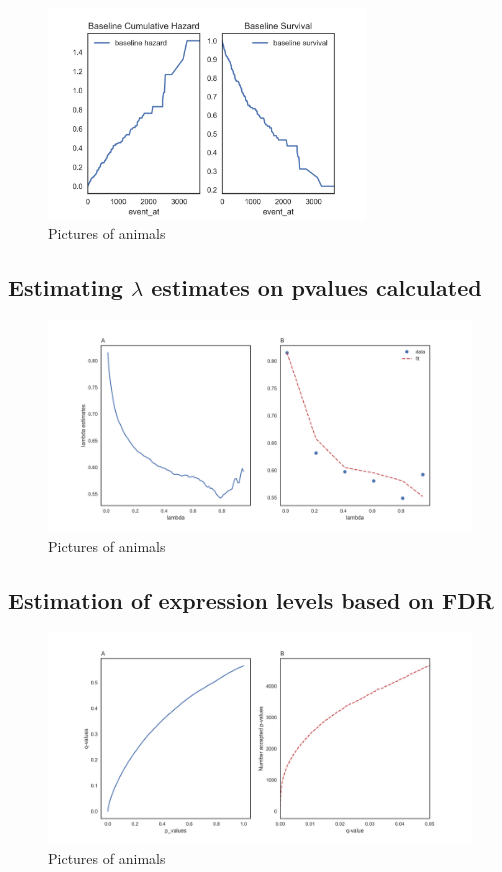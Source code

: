 \documentclass[a4paper,9pt]{article}
\begin{document}
\begin{figure}[bh]
    \centering
      \includegraphics[width=0.75\textwidth]{survial_plot_one_mock_gene.png}
    \caption{Pictures of animals}\label{fig:animals}
\end{figure}
  	
	
	\subsection {Estimating $\lambda$ estimates on pvalues calculated}
\begin{figure}[h]
    \centering
      \includegraphics[width=\textwidth]{lambdaestimatescurvefitting.png}
    \caption{Pictures of animals}\label{fig:animals}
\end{figure}


	\subsection {Estimation of expression levels based on FDR}
\begin{figure}[h]
    \centering
      \includegraphics[width=\textwidth]{comb.png}
    \caption{Pictures of animals}\label{fig:animals}
\end{figure}



\end{document}
